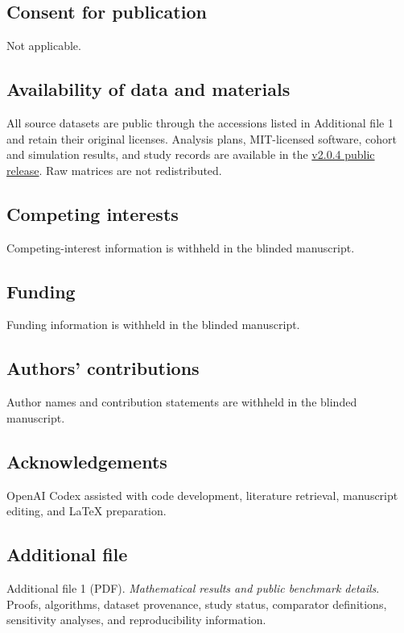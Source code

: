 \documentclass[pdflatex,sn-vancouver-num,iicol]{sn-jnl}
\begin{document}
\subsection*{Consent for publication}
Not applicable.

\subsection*{Availability of data and materials}
All source datasets are public through the accessions listed in Additional file 1 and retain their original licenses. Analysis plans, MIT-licensed software, cohort and simulation results, and study records are available in the \href{https://github.com/sushaan-k/coupling-fields-benchmark/releases/tag/coupling-fields-v2.0.4-public-benchmark}{v2.0.4 public release}. Raw matrices are not redistributed.

\subsection*{Competing interests}
Competing-interest information is withheld in the blinded manuscript.

\subsection*{Funding}
Funding information is withheld in the blinded manuscript.

\subsection*{Authors' contributions}
Author names and contribution statements are withheld in the blinded manuscript.

\subsection*{Acknowledgements}
OpenAI Codex assisted with code development, literature retrieval, manuscript editing, and \LaTeX{} preparation.

\subsection*{Additional file}
Additional file 1 (PDF). \emph{Mathematical results and public benchmark details}. Proofs, algorithms, dataset provenance, study status, comparator definitions, sensitivity analyses, and reproducibility information.


\end{document}
